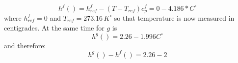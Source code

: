 \begin{equation}
h^f() = h^f_{ref} -(T-T_{ref})c_p^f = 0 - 4.186*  C^\circ   
\end{equation}
where \(h_{ref}^f=0\) and \(T_{ref} = 273.16\, K^\circ\) so that temperature is now measured in centigrades.
At the same time for \(g\) is 
\begin{equation}
h^g( ) = 2.26  - 1.996 C^\circ
\end{equation}
and therefore:
\begin{equation}
h^g()-h^f() = 2.26 - 2
\end{equation}
